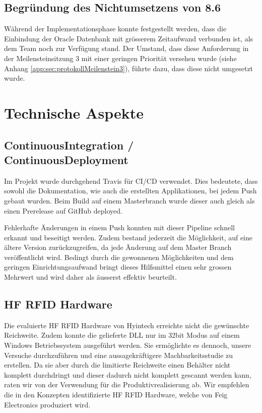 \subsection{Begründung des Nichtumsetzens von 8.6}
Während der Implementationsphase konnte festgestellt werden, dass die Einbindung der Oracle Datenbank mit grösserem Zeitaufwand verbunden ist, als dem Team noch zur Verfügung stand. Der Umstand, dass diese Anforderung in der Meilensteinsitzung 3 mit einer geringen Priorität versehen wurde (siehe Anhang \ref{app:sec:protokollMeilenstein3}), führte dazu, dass diese nicht umgesetzt wurde.

\section{Technische Aspekte}
\subsection{ContinuousIntegration / ContinuousDeployment}
Im Projekt wurde durchgehend Travis für CI/CD verwendet. Dies bedeutete, dass sowohl die Dokumentation, wie auch die erstellten Applikationen, bei jedem Push gebaut wurden. Beim Build auf einem Masterbranch wurde dieser auch gleich als einen Prerelease auf GitHub deployed.

Fehlerhafte Änderungen in einem Push konnten mit dieser Pipeline schnell erkannt und beseitigt werden. Zudem bestand jederzeit die Möglichkeit, auf eine ältere Version zurückzugreifen, da jede Änderung auf dem Master Branch veröffentlicht wird. Bedingt durch die gewonnenen Möglichkeiten und  dem geringen Einrichtungsaufwand bringt dieses Hilfsmittel einen sehr grossen Mehrwert und wird daher als äusserst effektiv beurteilt.

\subsection{HF RFID Hardware}
Die evaluierte \gls{HF} \gls{RFID} Hardware von Hyintech erreichte nicht die gewünschte Reichweite. Zudem konnte die gelieferte \gls{DLL} nur im 32bit Modus auf einem Windows Betriebssystem ausgeführt werden. Sie ermöglichte es dennoch, unsere Versuche durchzuführen und eine aussagekräftigere Machbarkeitsstudie zu erstellen. Da sie aber durch die limitierte Reichweite einen Behälter nicht komplett durchdringt und dieser dadurch nicht komplett gescannt werden kann, raten wir von der Verwendung für die Produktivrealisierung ab. Wir empfehlen die in den Konzepten identifizierte \gls{HF} \gls{RFID} Hardware, welche von Feig Electronics produziert wird.

